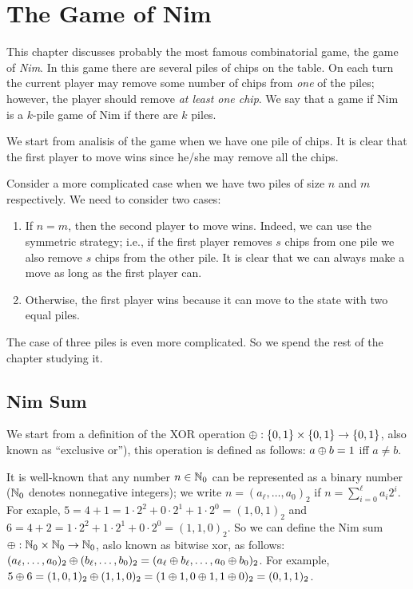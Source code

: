 \chapter{The Game of Nim}

This chapter discusses probably the most famous combinatorial game, the game
of \emph{Nim}.
In this game there are several piles of chips on the table. On each turn
the current player may remove some number of chips from \emph{one} of the piles;
however, the player should remove \emph{at least one chip}.
We say that a game if Nim is a $k$-pile game of Nim if there are $k$ piles.

We start from analisis of the game when we have one pile of chips. It is clear
that the first player to move wins since he/she may remove all the chips.

Consider a more complicated case when we have two piles of size $n$ and $m$
respectively. We need to consider two cases:
\begin{enumerate}
  \item If $n = m$, then the second player to move wins. Indeed, we can
    use the symmetric strategy; i.e., if the first player removes $s$
    chips from one pile we also remove $s$ chips from the other pile.
    It is clear that we can always make a move as long as the first player can.
  \item Otherwise, the first player wins because it can move to the state
    with two equal piles.
\end{enumerate}

The case of three piles is even more complicated. So we spend the rest of the
chapter studying it.

\section{Nim Sum}

We start from a definition of the XOR operation
$\lxor : \set{0, 1} \times \set{0, 1} \to \set{0, 1}$,
also known as ``exclusive or''), this operation is defined as follows:
$a \oplus b = 1$ iff $a \neq b$.

It is well-known that any number $n \in \mathbb{N}_0$
can be represented as a binary number ($\mathbb{N}_0$ denotes nonnegative integers);
we write $n = (a_\ell, \dots, a_0)_2$ if $n = \sum_{i = 0}^\ell a_i 2^i$.
For exaple,
$5 = 4 + 1 = 1 \cdot 2^2 + 0 \cdot 2^1 + 1 \cdot 2^0 = (1, 0, 1)_2$ and
$6 = 4 + 2 = 1 \cdot 2^2 + 1 \cdot 2^1 + 0 \cdot 2^0 = (1, 1, 0)_2$.
So we can define the Nim sum $\oplus : \mathbb{N}_0 \times \mathbb{N}_0 \to \mathbb{N}_0$, aslo
known as bitwise xor, as follows:
$(a_\ell, \dots, a_0)_2 \oplus (b_\ell, \dots, b_0)_2 =
    (a_\ell \oplus b_\ell, \dots, a_0 \oplus b_0)_2$.
For example, $5 \oplus 6 = (1, 0, 1)_2 \oplus (1, 1, 0)_2 =
(1 \oplus 1, 0 \oplus 1, 1 \oplus 0)_2 = (0, 1, 1)_2$.


